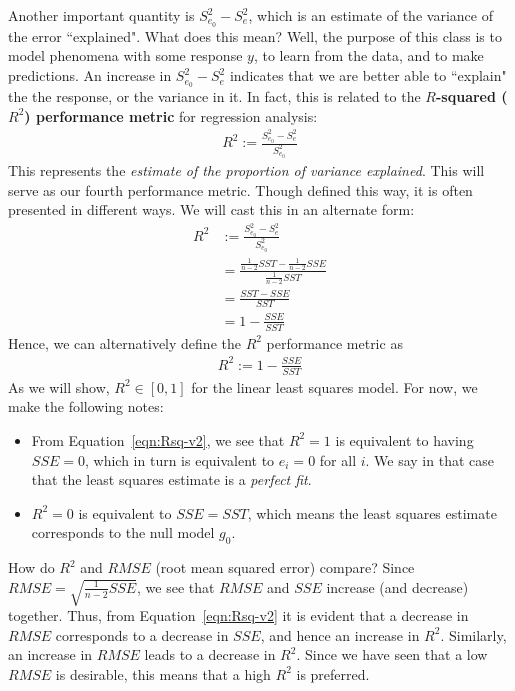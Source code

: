 \documentclass[12pt, a4paper]{article}
\theoremstyle{definition}
\begin{document}
	Another important quantity is $S_{e_0}^2-S_{e}^2$, which is an estimate of the
	variance of the error ``explained". What does this mean? Well, the purpose of this class
	is to model phenomena with some response $y$, to learn from the data, and to make predictions.
	An increase in $S_{e_0}^2-S_{e}^2$ indicates that we are better able to ``explain"
	the the response, or the variance in it. In fact, this is related to the
	\textbf{$R$-squared ($R^2$) performance metric} for regression analysis:
	\begin{align}
		R^2 := \frac{S_{e_0}^2-S_e^2}{S_{e_0}^2}\label{eqn:Rsq-v1}
	\end{align}
	This represents the \emph{estimate of the proportion of variance explained}.
	This will serve as our fourth performance metric. Though defined this way,
	it is often presented in different ways. We will cast this in an alternate form:
	\begin{align*}
		R^2 &:= \frac{S_{e_0}^2-S_e^2}{S_{e_0}^2}\\
		&=\frac{ \frac{1}{n-2}SST - \frac{1}{n-2} SSE }{\frac{1}{n-2} SST}\\
		&=\frac{SST - SSE}{SST}\\
		&=1 - \frac{SSE}{SST}
	\end{align*}
	Hence, we can alternatively define the $R^2$ performance metric as
	\begin{align}
		R^2 := 1 - \frac{SSE}{SST}\label{eqn:Rsq-v2}
	\end{align}
	As we will show, $R^2\in [0, 1]$ for the linear least squares model. For now,
	we make the following notes:
	\begin{itemize}
		\item From Equation~\ref{eqn:Rsq-v2}, we see that $R^2=1$ is equivalent to having
		$SSE = 0$, which in turn is equivalent to $e_i=0$ for all $i$. We say in that case that
		the least squares estimate is a \emph{perfect fit}.
		\item $R^2=0$ is equivalent to $SSE =SST$, which means the least squares estimate
		corresponds to the null model $g_0$.
	\end{itemize}
	How do $R^2$ and $RMSE$ (root mean squared error) compare? Since $RMSE = \sqrt{\frac{1}{n-2}SSE}$,
	we see that $RMSE$ and $SSE$ increase (and decrease) together. Thus, from Equation~\ref{eqn:Rsq-v2}
	it is evident that a decrease in $RMSE$ corresponds to a decrease in $SSE$,
	and hence an increase in $R^2$. Similarly, an increase in $RMSE$ leads to a decrease in $R^2$.
	Since we have seen that a low $RMSE$ is desirable, this means that a high $R^2$ is preferred.
	
\end{document}
